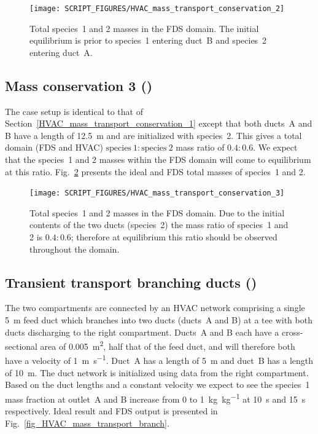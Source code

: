 \documentclass[11pt]{book}
\begin{document}
\begin{figure}[ht]
\centering
\texttt{[image: SCRIPT\_FIGURES/HVAC\_mass\_transport\_conservation\_2]}
\caption[ test case]{Total species~1 and 2 masses in the FDS domain. The initial equilibrium is prior to species~1 entering duct~B and species~2 entering duct~A.}
\label{fig_HVAC_mass_transport_conservation_2}
\end{figure}

\subsection{Mass conservation 3 (\texorpdfstring{}{HVAC\_mass\_transport\_conservation\_3})}
\label{HVAC_mass_transport_conservation_3}
The case setup is identical to that of Section~\ref{HVAC_mass_transport_conservation_1} except that both ducts~A and B have a length of \SI{12.5}{\meter} and are initialized with species~2. This gives a total domain (FDS and HVAC) \(\text{species}\ 1 \colon \text{species}\ 2\) mass ratio of \(0.4 \colon 0.6\). We expect that the species~1 and 2 masses within the FDS domain will come to equilibrium at this ratio. Fig.~\ref{fig_HVAC_mass_transport_conservation_3} presents the ideal and FDS total masses of species~1 and 2.

\begin{figure}[ht]
\centering
\texttt{[image: SCRIPT\_FIGURES/HVAC\_mass\_transport\_conservation\_3]}
\caption[ test case]{Total species~1 and 2 masses in the FDS domain. Due to the initial contents of the two ducts (species~2) the mass ratio of species~1 and 2 is \(0.4 \colon 0.6\); therefore at equilibrium this ratio should be observed throughout the domain.}
\label{fig_HVAC_mass_transport_conservation_3}
\end{figure}

\subsection{Transient transport branching ducts (\texorpdfstring{}{HVAC\_mass\_transport\_branch})}
\label{HVAC_mass_transport_branch}
The two compartments are connected by an HVAC network comprising a single \SI{5}{\meter} feed duct which branches into two ducts (ducts~A and B) at a tee with both ducts discharging to the right compartment. Ducts~A and B each have a cross-sectional area of \SI{0.005}{\meter\squared}, half that of the feed duct, and will therefore both have a velocity of \SI[per-mode=symbol]{1}{\meter\per\second}. Duct~A has a length of \SI{5}{\meter} and duct~B has a length of \SI{10}{\meter}. The duct network is initialized using data from the right compartment. Based on the duct lengths and a constant velocity we expect to see the species~\num{1} mass fraction at outlet~A and B increase from \num{0} to \SI[per-mode=symbol]{1}{\kilogram\per\kilogram} at \SI{10}{\second} and \SI{15}{\second} respectively. Ideal result and FDS output is presented in Fig.~\ref{fig_HVAC_mass_transport_branch}.
\end{document}
